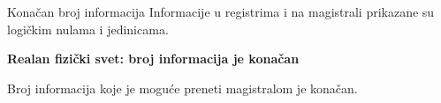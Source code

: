 \begin{frame}[label=04-s022]{Konačan broj informacija}
Informacije u registrima i na magistrali prikazane su logičkim nulama i jedinicama.
\par\vspace{1.5mm}
\textbf{Realan fizički svet: broj informacija je konačan}\par
{\fontsize{10}{12}\selectfont\renewcommand{\arraystretch}{1.1}\par}
\par\vspace{1.5mm}
Broj informacija koje je moguće preneti magistralom je konačan.
\begin{center}\end{center}
\end{frame}
